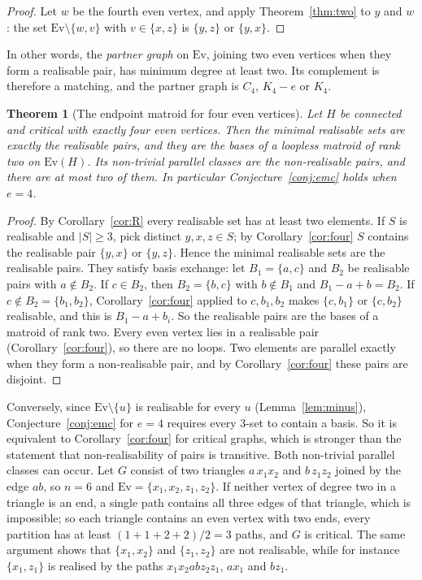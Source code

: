 \documentclass[11pt]{amsart}
\newtheorem{theorem}{Theorem}
\theoremstyle{definition}
\newcommand{\Ev}{\mathrm{Ev}}
\begin{document}
\begin{proof}
Let $w$ be the fourth even vertex, and apply Theorem~\ref{thm:two} to $y$ and $w$: the set
$\Ev\setminus\{w,v\}$ with $v\in\{x,z\}$ is $\{y,z\}$ or $\{y,x\}$.
\end{proof}

In other words, the \emph{partner graph} on $\Ev$, joining two even vertices when they form a
realisable pair, has minimum degree at least two. Its complement is therefore a matching, and the
partner graph is $C_4$, $K_4-e$ or $K_4$.

\begin{theorem}[The endpoint matroid for four even vertices]\label{thm:emc4}
Let $H$ be connected and critical with exactly four even vertices. Then the minimal realisable sets
are exactly the realisable pairs, and they are the bases of a loopless matroid of rank two on
$\Ev(H)$. Its non-trivial parallel classes are the non-realisable pairs, and there are at most two
of them. In particular Conjecture~\ref{conj:emc} holds when $e=4$.
\end{theorem}

\begin{proof}
By Corollary~\ref{cor:R} every realisable set has at least two elements. If $S$ is realisable and
$|S|\ge3$, pick distinct $y,x,z\in S$; by Corollary~\ref{cor:four} $S$ contains the realisable pair
$\{y,x\}$ or $\{y,z\}$. Hence the minimal realisable sets are the realisable pairs. They satisfy
basis exchange: let $B_1=\{a,c\}$ and $B_2$ be realisable pairs with $a\notin B_2$. If $c\in B_2$,
then $B_2=\{b,c\}$ with $b\notin B_1$ and $B_1-a+b=B_2$. If $c\notin B_2=\{b_1,b_2\}$,
Corollary~\ref{cor:four} applied to $c,b_1,b_2$ makes $\{c,b_1\}$ or $\{c,b_2\}$ realisable, and
this is $B_1-a+b_i$. So the realisable pairs are the bases of a matroid of rank two. Every even
vertex lies in a realisable pair (Corollary~\ref{cor:four}), so there are no loops. Two elements
are parallel exactly when they form a non-realisable pair, and by Corollary~\ref{cor:four} these
pairs are disjoint.
\end{proof}

Conversely, since $\Ev\setminus\{u\}$ is realisable for every $u$ (Lemma~\ref{lem:minus}),
Conjecture~\ref{conj:emc} for $e=4$ requires every $3$-set to contain a basis. So it is
equivalent to Corollary~\ref{cor:four} for critical graphs, which is stronger than the statement
that non-realisability of pairs is transitive. Both non-trivial parallel classes can occur. Let $G$ consist of two triangles $a\,x_1x_2$ and
$b\,z_1z_2$ joined by the edge $ab$, so $n=6$ and $\Ev=\{x_1,x_2,z_1,z_2\}$. If neither vertex of
degree two in a triangle is an end, a single path contains all three edges of that triangle, which is
impossible; so each triangle
contains an even vertex with two ends, every partition has at least $(1+1+2+2)/2=3$ paths, and $G$
is critical. The same argument shows that $\{x_1,x_2\}$ and $\{z_1,z_2\}$ are not realisable, while
for instance $\{x_1,z_1\}$ is realised by the paths $x_1x_2abz_2z_1$, $ax_1$ and $bz_1$.
\end{document}
